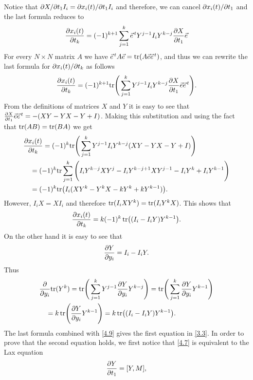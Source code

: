 \documentclass[11pt,reqno]{amsart}
\theoremstyle{definition}
\numberwithin{equation}{section}
\begin{document}
Notice that $\partial X/\partial t_1 I_i=\partial x_i(t)/\partial t_1 I_i$ and therefore, we can 
cancel $\partial x_i(t)/\partial t_1$ and the last formula reduces to 
\begin{equation*}
\frac{\partial x_i(t)}{\partial t_k}=(-1)^{k+1}\sum_{j=1}^k {\vec{e}}^{\,t} Y^{j-1} 
I_i Y^{k-j}\frac{\partial X}{\partial t_1}{\vec{e}} 
\end{equation*}
For every $N\times N$ matrix $A$ we have 
${\vec{e}}^{\,t}A{\vec{e}}=\mathrm{tr}(A{\vec{e}}{\vec{e}}^{\,t})$, and thus we can rewrite the last formula 
for $\partial x_i(t)/\partial t_k$ as follows
\begin{equation*}
\frac{\partial x_i(t)}{\partial t_k}=(-1)^{k+1}\mathrm{tr}\Bigg(\sum_{j=1}^k Y^{j-1} 
I_i Y^{k-j}\frac{\partial X}{\partial t_1}{\vec{e}}{\vec{e}}^{\,t}\Bigg).
\end{equation*}
From the definitions of matrices $X$ and $Y$ it is easy to see that 
$\frac{\partial X}{\partial t_1}{\vec{e}}{\vec{e}}^{\,t}=-(XY-YX-Y+I)$. Making this substitution and 
using the fact that $\mathrm{tr}(AB)=\mathrm{tr}(BA)$ we get
\begin{align*}
&\frac{\partial x_i(t)}{\partial t_k}=(-1)^{k}\mathrm{tr}\Bigg(\sum_{j=1}^k Y^{j-1} 
I_i Y^{k-j}(XY-YX-Y+I)\Bigg) \\
&\quad =(-1)^{k}\mathrm{tr}\sum_{j=1}^k\Bigg(I_iY^{k-j}XY^{j}-I_iY^{k-j+1}XY^{j-1}
-I_iY^{k}+I_iY^{k-1}\Bigg)\\
&\quad =(-1)^{k}\mathrm{tr}\big(I_i(XY^k-Y^kX-kY^k+kY^{k-1})\big).
\end{align*}
However, $I_iX=XI_i$ and therefore $\mathrm{tr}(I_iXY^{k})=\mathrm{tr}(I_iY^{k}X)$. This 
shows that
\begin{equation}                                           \label{4.9}
\frac{\partial x_i(t)}{\partial t_k}=k(-1)^{k}\,\mathrm{tr}\big((I_i-I_iY)Y^{k-1}\big).
\end{equation}
On the other hand it is easy to see that 
\begin{equation*}
\frac{\partial Y}{\partial y_i}=I_i-I_iY.
\end{equation*}
Thus
\begin{align*}
&\frac{\partial }{\partial y_i}\mathrm{tr}(Y^k)=\mathrm{tr}\Bigg(\sum_{j=1}^kY^{j-1}
\frac{\partial Y}{\partial y_i}Y^{k-j}\Bigg)
=\mathrm{tr}\Bigg(\sum_{j=1}^k
\frac{\partial Y}{\partial y_i}Y^{k-1}\Bigg)\\
&\quad =k\,\mathrm{tr}\Bigg(\frac{\partial Y}{\partial y_i}Y^{k-1}\Bigg)
=k\,\mathrm{tr}\big((I_i-I_iY)Y^{k-1}\big).
\end{align*}
The last formula combined with \eqref{4.9} gives the first equation in 
\eqref{3.3}. In order to prove that the second equation holds, we first 
notice that \eqref{4.7} is equivalent to the Lax equation 
\begin{equation}\label{4.10}
\frac{\partial Y}{\partial t_1}=[Y,M],
\end{equation}
\end{document}
